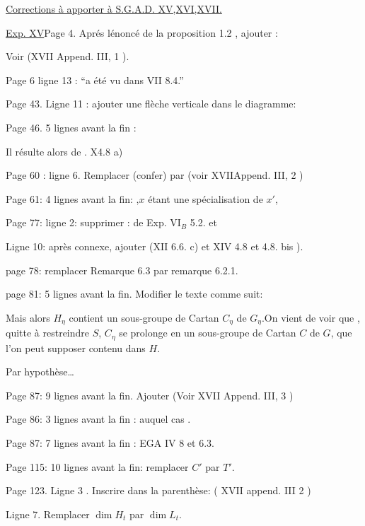 \uline{Corrections à apporter à S.G.A.D. XV,XVI,XVII.}

\uline{Exp. XV}\quad Page 4. Aprés lénoncé de la proposition 1.2 , ajouter :

Voir (XVII Append. III, 1 ).

Page 6 ligne 13 : ``a été vu dans  VII 8.4.''

Page 43. Ligne 11 : ajouter une flèche verticale dans le diagramme:

Page 46. 5 lignes avant la fin :

Il résulte alors de . X\inserted{,}4.8\inserted{(} a)

Page 60 : ligne 6. Remplacer (confer\hspace{2em}) par (voir XVII\inserted{,}Append. III, 2 )

Page 61: 4 lignes avant la fin: ,$x$ étant une spécialisation de $x'$, 

Page 77: ligne 2: supprimer : de Exp. VI$_B$ 5.2. et

Ligne 10: après connexe, ajouter (XII 6.6. c) et XIV 4.8 et 4.8. bis ).

page 78: remplacer Remarque 6.3 par remarque 6.2.1.

page 81: 5 lignes avant la fin. Modifier le texte comme suit:

Mais alors $H_\eta$ contient un sous-groupe de Cartan $C_\eta$ de $G_\eta$.On vient de voir que , quitte à restreindre $S$, $C_\eta$ se prolonge en un sous-groupe de Cartan $C$ de $G$, que l'on peut supposer contenu dans $H$.

Par hypothèse\ldots

Page 87: 9 lignes avant la fin. Ajouter (Voir XVII\inserted{,} Append. III, 3 )

Page 86: 3 lignes avant la fin : auquel cas .

Page 87: 7 lignes avant la fin : EGA IV 8 et 6.3.

Page 115: 10 lignes avant la fin: remplacer $C'$ par $T'$.

Page 123. Ligne 3 . Inscrire dans la parenthèse: ( XVII append. III\inserted{,} 2 )

Ligne 7. Remplacer $\dim H_t$ par $\dim L_t$.

